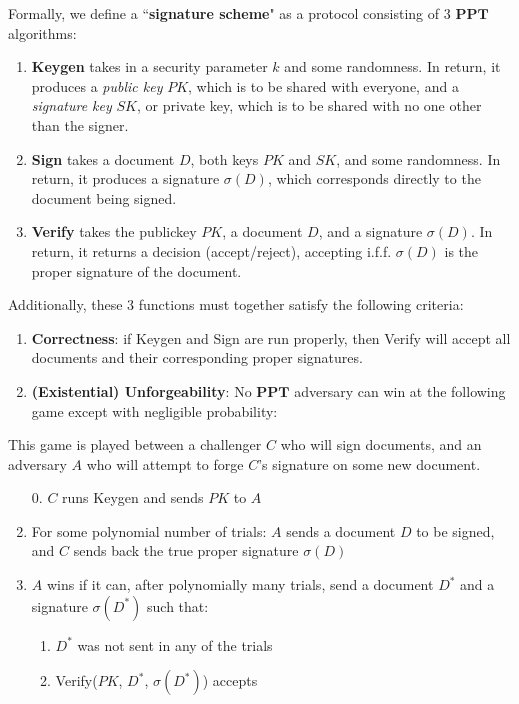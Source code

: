 \documentclass[11pt]{article}
\newcommand{\PPT}{\mathbf{PPT}}
\begin{document}
Formally, we define a ``\textbf{signature scheme}" as a protocol consisting of \(3\) \(\PPT\) algorithms:
\begin{enumerate}
\item \textbf{Keygen} takes in a security parameter \(k\) and some randomness. In return, it produces a \emph{public key} \(PK\), which is to be shared with everyone, and a \emph{signature key} \(SK\), or private key, which is to be shared with no one other than the signer.
\item \textbf{Sign} takes a document \(D\), both keys \(PK\) and \(SK\), and some randomness. In return, it produces a signature \(\sigma(D)\), which corresponds directly to the document being signed.
\item \textbf{Verify} takes the publickey \(PK\), a document \(D\), and a signature \(\sigma(D)\). In return, it returns a decision (accept/reject), accepting i.f.f. \(\sigma(D)\) is the proper signature of the document.
\end{enumerate}
Additionally, these \(3\) functions must together satisfy the following criteria:
\begin{enumerate}
\item \textbf{Correctness}: if Keygen and Sign are run properly, then Verify will accept all documents and their corresponding proper signatures.
\item \textbf{(Existential) Unforgeability}: No \(\PPT\) adversary can win at the following game except with negligible probability:
\end{enumerate}
This game is played between a challenger \(C\) who will sign documents, and an adversary \(A\) who will attempt to forge \(C\)'s signature on some new document.
\begin{enumerate}
\item [0.] \(C\) runs Keygen and sends \(PK\) to \(A\)
\item For some polynomial number of trials: \(A\) sends a document \(D\) to be signed, and \(C\) sends back the true proper signature \(\sigma(D)\)
\item \(A\) wins if it can, after polynomially many trials, send a document \(D^*\) and a signature \(\sigma(D^*)\) such that:
\begin{enumerate}
\item \(D^*\) was not sent in any of the trials
\item Verify(\(PK\), \(D^*\), \(\sigma(D^*)\)) accepts
\end{enumerate}
\end{enumerate}
\end{document}
